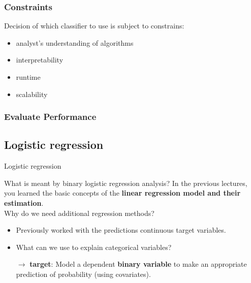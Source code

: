 \documentclass{beamer}
\begin{document}



\begin{frame}
	\frametitle{Constraints}
	Decision of which classifier to use is subject to constrains:
	\begin{itemize}
		\item analyst's understanding of algorithms
		\vspace{0.2cm}
		\item interpretability
		\vspace{0.2cm}
		\item runtime
		\vspace{0.2cm}
		\item scalability
	\end{itemize}
\end{frame}







\subsubsection{Evaluate Performance}







\subsection{Logistic regression}

\begin{frame}
	\begin{center}
		\Large{\textcolor{dkblue}{Logistic regression}}
	\end{center}
\end{frame}



\begin{frame}{What is meant by binary logistic regression analysis?}
	\vspace{-3mm}
	In the previous lectures, you learned the basic concepts of the\textbf{ linear regression model and their estimation}.\\
	\vspace{3mm}
	Why do we need additional regression methods?
	\vspace{3mm}
	\begin{itemize}
		\item Previously worked with the predictions continuous target variables. 
		\vspace{3mm}
		\item What can we use to explain categorical variables?
		\vspace{3mm}
		\item[$\rightarrow$] \textbf{target}: Model a dependent \textbf{binary variable} to make an appropriate prediction of probability (using covariates).
\end{itemize}
\end{frame}		
\end{document}
